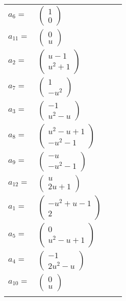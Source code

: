 \documentclass[1p]{elsarticle_modified}
\theoremstyle{definition}
\begin{document}
\begin{tabular}{m{7pt} m{180pt} m{7pt} m{180pt} }
\flushright $a_{6}=$&$\begin{pmatrix}1\\0\end{pmatrix}$ \\
\flushright $a_{11}=$&$\begin{pmatrix}0\\u\end{pmatrix}$ \\
\flushright $a_{2}=$&$\begin{pmatrix}u-1\\u^2+1\end{pmatrix}$ \\
\flushright $a_{7}=$&$\begin{pmatrix}1\\- u^2\end{pmatrix}$ \\
\flushright $a_{3}=$&$\begin{pmatrix}-1\\u^2- u\end{pmatrix}$ \\
\flushright $a_{8}=$&$\begin{pmatrix}u^2- u+1\\- u^2-1\end{pmatrix}$ \\
\flushright $a_{9}=$&$\begin{pmatrix}- u\\- u^2-1\end{pmatrix}$ \\
\flushright $a_{12}=$&$\begin{pmatrix}u\\2 u+1\end{pmatrix}$ \\
\flushright $a_{1}=$&$\begin{pmatrix}- u^2+u-1\\2\end{pmatrix}$ \\
\flushright $a_{5}=$&$\begin{pmatrix}0\\u^2- u+1\end{pmatrix}$ \\
\flushright $a_{4}=$&$\begin{pmatrix}-1\\2 u^2- u\end{pmatrix}$ \\
\flushright $a_{10}=$&$\begin{pmatrix}0\\u\end{pmatrix}$\\&\end{tabular}
\end{document}
